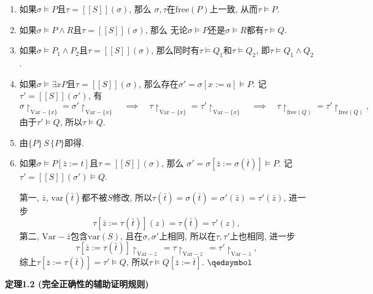 \documentclass[UTF8]{ctexart}
\begin{document}
\begin{enumerate}
    \item 如果$\sigma\models P$且$\tau=[\![S]\!](\sigma)$, 那么
    $\sigma,\tau$在$\mathrm{free}(P)$上一致, 从而$\tau\models P$.
    \item 如果$\sigma\models P\land R$且$\tau=[\![S]\!](\sigma)$, 那么
    无论$\sigma\models P$还是$\sigma\models R$都有$\tau\models Q$.
    \item 如果$\sigma\models P_1\land P_2$且$\tau=[\![S]\!](\sigma)$,
    那么同时有$\tau\models Q_1$和$\tau\models Q_2$, 即$\tau\models Q_1\land Q_2$.
    \item 如果$\sigma\models\exists xP$且$\tau=[\![S]\!](\sigma)$,
    那么存在$\sigma'=\sigma[x:=a]\models P$. 记$\tau'=[\![S]\!](\sigma')$, 有
    \[
        \sigma\!\restriction_{\mathrm{Var}-\{x\}}=
        \sigma'\!\restriction_{\mathrm{Var}-\{x\}}\quad\implies\quad
        \tau\!\restriction_{\mathrm{Var}-\{x\}}=
        \tau'\!\restriction_{\mathrm{Var}-\{x\}}\quad\implies\quad
        \tau\!\restriction_{\mathrm{free}(Q)}=
        \tau'\!\restriction_{\mathrm{free}(Q)},
    \]
    由于$\tau'\models Q$, 所以$\tau\models Q$.
    \vspace{3pt}
    \item 由$\{P\}\,S\,\{P\}$即得.
    \item 如果$\sigma\models P[\bar{z}:=t]$且$\tau=[\![S]\!](\sigma)$, 那么
    $\sigma'=\sigma[\bar{z}:=\sigma(\bar{t})]\models P$.
    记$\tau'=[\![S]\!](\sigma')\models Q$.

    \hspace{2.17em}
    第一, $\bar{z}$, $\mathrm{var}(\bar{t})$都不被$S$修改,
    所以$\tau(\bar{t})=\sigma(\bar{t})=\sigma'(\bar{z})=\tau'(\bar{z})$, 进一步
    \[
        \tau[\bar{z}:=\tau(\bar{t})](z)=\tau(\bar{t})=\tau'(z),
    \]
    第二, $\mathrm{Var}-\bar{z}$包含$\mathrm{var}(S)$,
    且在$\sigma,\sigma'$上相同, 所以在$\tau,\tau'$上也相同, 进一步
    \[
        \tau[\bar{z}:=\tau(\bar{t})]\!\restriction_{\mathrm{Var}-\bar{z}}\,=
        \tau\!\restriction_{\mathrm{Var}-\bar{z}}\,=
        \tau'\!\restriction_{\mathrm{Var}-\bar{z}},
    \]
    综上$\tau[\bar{z}:=\tau(\bar{t})]=\tau'\models Q$,
    所以$\tau\models Q[\bar{z}:=\bar{t}]$. \hfill $\qedsymbol$
\end{enumerate}

\vspace{20pt}

\hypertarget{sec:定理1.2}{}
\noindent\textbf{定理1.2 (完全正确性的辅助证明规则)}
\end{document}
